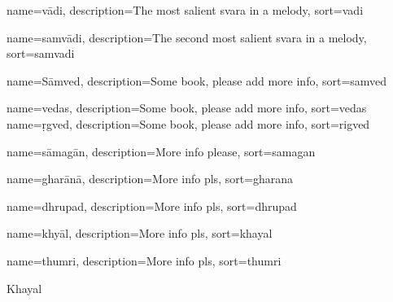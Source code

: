 	
	
{
	name={v\={a}di},
	description={The most salient svara in a melody},
	sort=vadi
}

{
	name={samv\={a}di},
	description={The second most salient svara in a melody},
	sort=samvadi
}

{
	name={S\={a}mved},
	description={Some book, please add more info},
	sort=samved
}

{
	name={vedas},
	description={Some book, please add more info},
	sort=vedas
}
{
	name={\d{r}gved},
	description={Some book, please add more info},
	sort=rigved
}

{
	name={s\={a}mag\={a}n},
	description={More info please},
	sort=samagan
}

{
	name={ghar\={a}n\={a}},
	description={More info pls},
	sort=gharana
}

{
	name={dhrupad},
	description={More info pls},
	sort=dhrupad
}

{
	name={khy\={a}l},
	description={More info pls},
	sort=khayal
}

{
	name={thumri},
	description={More info pls},
	sort=thumri
}

Khayal


		


